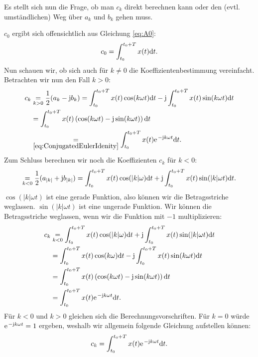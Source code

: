 \documentclass[11pt,a4paper,DIV=12]{scrartcl}
\begin{document}
%
Es stellt sich nun die Frage, ob man $c_k$ direkt berechnen kann oder den (evtl.
umständlichen) Weg über $a_k$ und $b_k$ gehen muss.

$c_0$ ergibt sich offensichtlich aus Gleichung \eqref{eq:A0}:
%
\begin{align}
	c_0=\int_{t_0}^{t_0+T}x(t)\mathrm{d} t.
\end{align}
%
Nun schauen wir, ob sich auch für $k\neq0$ die Koeffizientenbestimmung
vereinfacht.
%
Betrachten wir nun den Fall $k>0$:
%
\begin{align}
	c_k&\underset{k>0}{=}\frac{1}{2}(a_k-\im b_k)
	=\int_{t_0}^{t_0+T}x(t)\cos(k \omega t)\diff t-\im\int_{t_0}^{t_0+T}x(t)\sin(k \omega t)\diff t\nonumber\\
	&=\int_{t_0}^{t_0+T}x(t)\left (\cos(k\omega t)-\im\sin(k\omega t) \right )\diff t\nonumber\\
	&\underset{\eqref{eq:ConjugatedEulerIdenity}}{=}\int_{t_0}^{t_0+T}x(t)\e^{-\im k \omega t}\diff t.
\end{align}
%
Zum Schluss berechnen wir noch die Koeffizienten $c_k$ für $k<0$:
%
\begin{align}
	\underset{k<0}{=}\frac{1}{2}(a_{|k|}+\im b_{|k|})
	=\int_{t_0}^{t_0+T}x(t)\cos(|k|\omega)\diff t+\im\int_{t_0}^{t_0+T}x(t)\sin(|k| \omega t)\diff t.
\end{align}
%
$\cos(|k| \omega t)$ ist eine gerade Funktion, also können wir die Betragsstriche
weglassen.
%
$\sin(|k| \omega t)$ ist eine ungerade Funktion. Wir können die Betragsstriche
weglassen, wenn wir die Funktion mit $-1$ multiplizieren:
%
\begin{align}
	c_k&\underset{k<0}{=}\int_{t_0}^{t_0+T}x(t)\cos(|k|\omega)\diff t+\im\int_{t_0}^{t_0+T}x(t)\sin(|k| \omega t)\diff t\nonumber\\
	&=\int_{t_0}^{t_0+T}x(t)\cos(k\omega)\diff t-\im\int_{t_0}^{t_0+T}x(t)\sin(k \omega t)\diff t\nonumber\\
	&=\int_{t_0}^{t_0+T}x(t)\left (\cos(k\omega t)-\im\sin(k\omega t)\right )\diff t\nonumber\\
	&=\int_{t_0}^{t_0+T}x(t)\e^{-\im k \omega t}\diff t.
\end{align}
%
Für $k<0$ und $k>0$ gleichen sich die Berechnungsvorschriften. Für $k=0$ würde
$\e^{-\im k \omega t}=1$ ergeben, weshalb wir allgemein folgende Gleichung
aufstellen können:
%
\begin{align}
	c_k=\int_{t_0}^{t_0+T}x(t)\e^{-\im k \omega t}\diff t.
\end{align}
%
\end{document}
